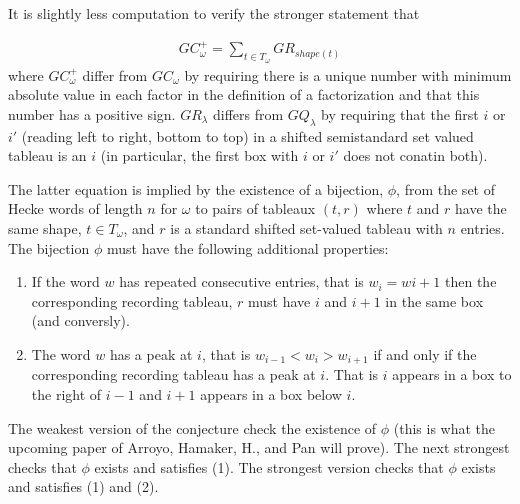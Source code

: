 \documentclass[]{amsart}
\theoremstyle{definition}
\begin{document}
It is slightly less computation to verify the stronger statement  that

\begin{eqnarray*}
GC_{\omega}^{+}=\sum_{t  \in T_{\omega}} GR_{shape(t)}
\end{eqnarray*}
where $GC_{\omega}^{+}$ differ from $GC_{\omega}$  by requiring there is a unique number with minimum absolute value in each factor in the definition of a factorization and that this number has a positive sign. $GR_{\lambda}$ differs from $GQ_{\lambda}$ by requiring that the first $i$ or $i'$ (reading left to right, bottom to top) in a shifted semistandard set valued tableau is an $i$ (in particular, the first box with $i$ or $i'$ does not conatin both).  

The latter equation is implied by the existence of a bijection,  $\phi$, from the set of Hecke words of length $n$ for $\omega$ to pairs of tableaux $(t,r)$ where $t$ and $r$ have the same shape, $t \in T_{\omega}$,  and $r$ is a standard shifted set-valued tableau with $n$ entries.  The bijection $\phi$ must have the following additional properties:


\begin{enumerate}
\item If the word $w$ has repeated consecutive entries, that is $w_i=w{i+1}$ then the corresponding recording tableau, $r$ must have $i$ and $i+1$ in the same box (and conversly).  
\item The word $w$ has a peak at $i$, that is $w_{i-1}<w_{i}>w_{i+1}$ if and only if the corresponding recording tableau has a peak at $i$.  That is $i$ appears in a box to the right of $i-1$ and $i+1$ appears in a box below $i$.
\end{enumerate}

The weakest version of the conjecture check the existence of $\phi$ (this is what the upcoming paper of Arroyo, Hamaker, H., and Pan will prove).  The next strongest checks that $\phi$ exists and satisfies (1).  The strongest version checks that $\phi$ exists and satisfies (1) and (2).
\end{document}
